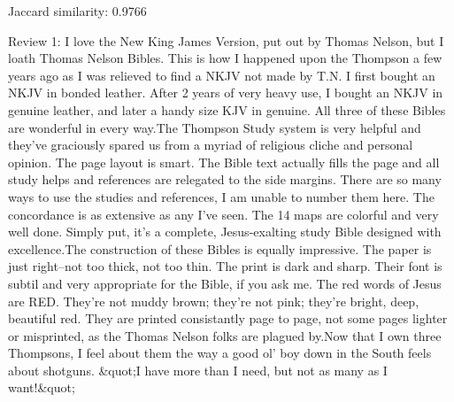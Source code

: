 \documentclass[12pt, a4paper[]{article}
\begin{document}
\begin{itemize}
{    \item Jaccard similarity: 0.9766
    }
\end{itemize}
\dotfill
\begin{itemize}
    {\fontsize{9pt}{11pt}\selectfont
    \item Review 1: I love the New King James Version, put out by Thomas Nelson, but I loath Thomas Nelson Bibles. This is how I happened upon the Thompson a few years ago as I was relieved to find a NKJV not made by T.N. I first bought an NKJV in bonded leather. After 2 years of very heavy use, I bought an NKJV in genuine leather, and later a handy size KJV in genuine. All three of these Bibles are wonderful in every way.The Thompson Study system is very helpful and they've graciously spared us from a myriad of religious cliche and personal opinion. The page layout is smart. The Bible text actually fills the page and all study helps and references are relegated to the side margins. There are so many ways to use the studies and references, I am unable to number them here. The concordance is as extensive as any I've seen. The 14 maps are colorful and very well done. Simply put, it's a complete, Jesus-exalting study Bible designed with excellence.The construction of these Bibles is equally impressive. The paper is just right--not too thick, not too thin. The print is dark and sharp. Their font is subtil and very appropriate for the Bible, if you ask me. The red words of Jesus are RED. They're not muddy brown; they're not pink; they're bright, deep, beautiful red. They are printed consistantly page to page, not some pages lighter or misprinted, as the Thomas Nelson folks are plagued by.Now that I own three Thompsons, I feel about them the way a good ol' boy down in the South feels about shotguns. &quot;I have more than I need, but not as many as I want!&quot;
}
\end{itemize}
\end{document}
